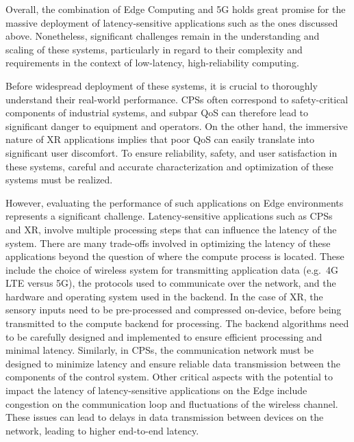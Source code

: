 Overall, the combination of Edge Computing and 5G holds great promise for the massive deployment of latency-sensitive applications such as the ones discussed above.
Nonetheless, significant challenges remain in the understanding and scaling of these systems, particularly in regard to their complexity and requirements in the context of low-latency, high-reliability computing.

Before widespread deployment of these systems, it is crucial to thoroughly understand their real-world performance.
\glspl{CPS} often correspond to safety-critical components of industrial systems, and subpar \gls{QoS} can therefore lead to significant danger to equipment and operators.
On the other hand, the immersive nature of \gls{XR} applications implies that poor \gls{QoS} can easily translate into significant user discomfort.
To ensure reliability, safety, and user satisfaction in these systems, careful and accurate characterization and optimization of these systems must be realized.

However, evaluating the performance of such applications on Edge environments represents a significant challenge.
Latency-sensitive applications such as \glspl{CPS} and \gls{XR}, involve multiple processing steps that can influence the latency of the system.
There are many trade-offs involved in optimizing the latency of these applications beyond the question of where the compute process is located. 
These include the choice of wireless system for transmitting application data (e.g.\ 4G \gls{LTE} versus 5G), the protocols used to communicate over the network, and the hardware and operating system used in the backend.
In the case of \gls{XR}, the sensory inputs need to be pre-processed and compressed on-device, before being transmitted to the compute backend for processing.
The backend algorithms need to be carefully designed and implemented to ensure efficient processing and minimal latency. 
Similarly, in \glspl{CPS}, the communication network must be designed to minimize latency and ensure reliable data transmission between the components of the control system.
Other critical aspects with the potential to impact the latency of latency-sensitive applications on the Edge include congestion on the communication loop and fluctuations of the wireless channel.
These issues can lead to delays in data transmission between devices on the network, leading to higher end-to-end latency.

